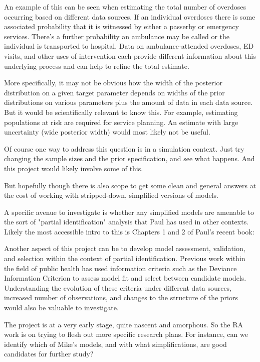 \documentclass[]{article}
\begin{document}
\begin{enumerate}
	An example of this can be seen when estimating the total number of overdoses occurring based on different data sources. If an individual overdoses there is some associated probability that it is witnessed by either a passerby or emergency services. There’s a further probability an ambulance may be called or the individual is transported to hospital. Data on ambulance-attended overdoses, ED visits, and other uses of intervention each provide different information about this underlying process and can help to refine the total estimate.
	
	More specifically, it may not be obvious how the width of the posterior distribution on a given target parameter depends on widths of the prior distributions on various parameters plus the amount of data in each data source. But it would be scientifically relevant to know this. For example, estimating populations at risk are required for service planning. An estimate with large uncertainty (wide posterior width) would most likely not be useful. 
	
	Of course one way to address this question is in a simulation context. Just try changing the sample sizes and the prior specification, and see what happens. And this project would likely involve some of this.
	
	But hopefully though there is also scope to get some clean and general answers at the cost of working with stripped-down, simplified versions of models.
	
	A specific avenue to investigate is whether any simplified models are amenable to the sort of "partial identification" analysis that Paul has used in other contexts. Likely the most accessible intro to this is Chapters 1 and 2 of Paul's recent book:
	
	Another aspect of this project can be to develop model assessment, validation, and selection within the context of partial identification. Previous work within the field of public health has used information criteria such as the Deviance Information Criterion to assess model fit and select between candidate models. Understanding the evolution of these criteria under different data sources, increased number of observations, and changes to the structure of the priors would also be valuable to investigate.
	
	The project is at a very early stage, quite nascent and amorphous. So the RA work is on trying to flesh out more specific research plans. For instance, can we identify which of Mike's models, and with what simplifications, are good candidates for further study?
	

\end{enumerate}
\end{document}

